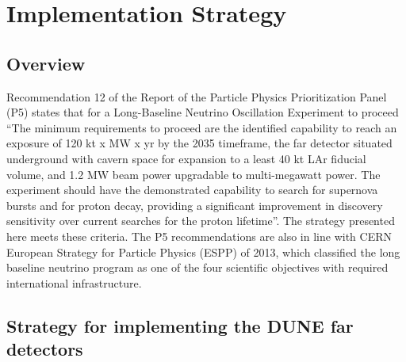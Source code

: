 \chapter{Implementation Strategy}
\label{ch:detectors-strategy}

\section{Overview}

Recommendation 12 of the Report of the Particle Physics Prioritization Panel (P5) 
states that for a Long-Baseline Neutrino Oscillation Experiment to proceed ``The 
minimum requirements to proceed are the identified capability to reach an exposure 
of 120 kt x MW x yr by the 2035 timeframe, the far detector situated underground 
with cavern space for expansion to a least 40 kt LAr fiducial volume, and 1.2 MW 
beam power upgradable to multi-megawatt power. The experiment should have the demonstrated 
capability to search for supernova bursts and for proton decay, providing a significant 
improvement in discovery sensitivity over current searches for the proton lifetime''. 
The strategy presented here meets these criteria. 
The P5 recommendations are also in line with CERN European Strategy for Particle 
Physics (ESPP) of 2013, which classified the long baseline neutrino program as 
one of the four scientific objectives with required international infrastructure.

\section{Strategy for implementing the DUNE far detectors}


